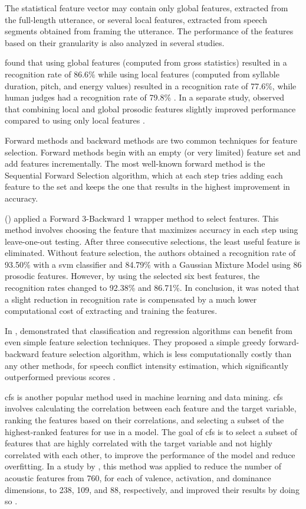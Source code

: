 The statistical feature vector may contain only global features, extracted from the full-length utterance, or several local features, extracted from speech segments obtained from framing the utterance. The performance of the features based on their granularity is also analyzed in several studies.

\citeauthor{1202279} found that using global features (computed from gross statistics) resulted in a recognition rate of 86.6\% while using local features (computed from syllable duration, pitch, and energy values) resulted in a recognition rate of 77.6\%, while human judges had a recognition rate of 79.8\% \cite{1202279}. In a separate study, \citeauthor{Rao2012} observed that combining local and global prosodic features slightly improved performance compared to using only local features \cite{Rao2012}.


Forward methods and backward methods are two common techniques for feature selection. Forward methods begin with an empty (or very limited) feature set and add features incrementally. The most well-known forward method is the Sequential Forward Selection algorithm, which at each step tries adding each feature to the set and keeps the one that results in the highest improvement in accuracy.

\citeauthor{Luengo2005} (\citeyear{Luengo2005}) applied a Forward 3-Backward 1 wrapper method to select features. This method involves choosing the feature that maximizes accuracy in each step using leave-one-out testing. After three consecutive selections, the least useful feature is eliminated. Without feature selection, the authors obtained a recognition rate of 93.50\% with a \ac{svm} classifier and 84.79\% with a Gaussian Mixture Model using 86 prosodic features. However, by using the selected six best features, the recognition rates changed to 92.38\% and 86.71\%. In conclusion, it was noted that a slight reduction in recognition rate is compensated by a much lower computational cost of extracting and training the features.

In \citeyear{Gosztolya2015}, \citeauthor{Gosztolya2015} demonstrated that classification and regression algorithms can benefit from even simple feature selection techniques. They proposed a simple greedy forward-backward feature selection algorithm, which is less computationally costly than any other methods, for speech conflict intensity estimation, which significantly outperformed previous scores \cite{Gosztolya2015}.


\ac{cfs} is another popular method used in machine learning and data mining. \ac{cfs} involves calculating the correlation between each feature and the target variable, ranking the features based on their correlations, and selecting a subset of the highest-ranked features for use in a model. The goal of \ac{cfs} is to select a subset of features that are highly correlated with the target variable and not highly correlated with each other, to improve the performance of the model and reduce overfitting. In a study by \citeauthor{Schuller3D2011}, this method was applied to reduce the number of acoustic features from 760, for each of valence, activation, and dominance dimensions, to 238, 109, and 88, respectively, and improved their results by doing so \cite{Schuller3D2011}.

